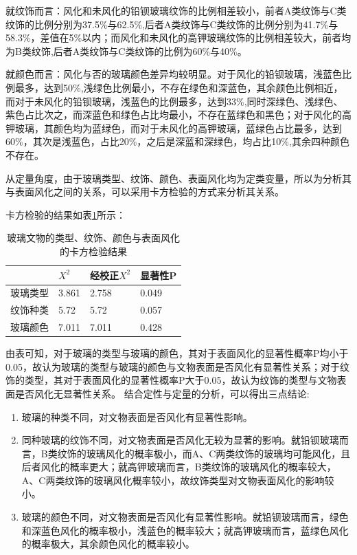 \documentclass{my_paper}
\begin{document}
就纹饰而言：风化和未风化的铅钡玻璃纹饰的比例相差较小，前者A类纹饰与C类纹饰的比例分别为37.5\%与62.5\%,后者A类纹饰与C类纹饰的比例分别为41.7\%与58.3\%，差值在5\%以内；而风化和未风化的高钾玻璃纹饰的比例相差较大，前者均为B类纹饰,后者A类纹饰与C类纹饰的比例为60\%与40\%。\par
就颜色而言：风化与否的玻璃颜色差异均较明显。对于风化的铅钡玻璃，浅蓝色比例最多，达到50\%,浅绿色比例最小，不存在绿色和深蓝色，其余颜色比例相近，而对于未风化的铅钡玻璃，浅蓝色的比例最多，达到33\%,同时深绿色、浅绿色、紫色占比次之，而深蓝色和绿色占比均最小，不存在蓝绿色和黑色；对于风化的高钾玻璃，其颜色均为蓝绿色，而对于未风化的高钾玻璃，蓝绿色占比最多，达到60\%，其次是浅蓝色，占比20\%，之后是深蓝和深绿色，均占比10\%,其余四种颜色不存在。\par
从定量角度，由于玻璃类型、纹饰、颜色、表面风化均为定类变量，所以为分析其与表面风化之间的关系，可以采用卡方检验的方式来分析其关系。\par
卡方检验的结果如表\ref{卡方检验结果}所示：
\begin{table}[H]
    \centering
    \caption{玻璃文物的类型、纹饰、颜色与表面风化的卡方检验结果}
    \label{卡方检验结果}
    \begin{tabular}{llll}
    \hline
        & $X^2$ & 经校正$X^2$ & 显著性P \\ \hline
        玻璃类型 & 3.861 & 2.758 & 0.049 \\ 
        纹饰种类 & 5.72 & 5.72 & 0.057 \\ 
        玻璃颜色 & 7.011 & 7.011 & 0.428 \\ \hline
    \end{tabular}
\end{table}

由表可知，对于玻璃的类型与玻璃的颜色，其对于表面风化的显著性概率P均小于0.05，故认为玻璃的类型与玻璃的颜色与文物表面是否风化有显著性关系；对于纹饰的类型，其对于表面风化的显著性概率P大于0.05，故认为纹饰的类型与文物表面是否风化无显著性关系。
结合定性与定量的分析，可以得出三点结论:
\begin{enumerate}
    \item 玻璃的种类不同，对文物表面是否风化有显著性影响。
    \item 同种玻璃的纹饰不同，对文物表面是否风化无较为显著的影响。就铅钡玻璃而言，B类纹饰的玻璃风化的概率极小，而A、C两类纹饰的玻璃均可能风化，且后者风化的概率更大；就高钾玻璃而言，B类纹饰的玻璃风化的概率较大，A、C两类纹饰的玻璃风化概率较小，故纹饰类型对文物表面风化的影响较小。
    \item 玻璃的颜色不同，对文物表面是否风化有显著性影响。就铅钡玻璃而言，绿色和深蓝色风化的概率极小，浅蓝色的概率较大；就高钾玻璃而言，蓝绿色风化的概率极大，其余颜色风化的概率较小。
\end{enumerate}
\end{document}
